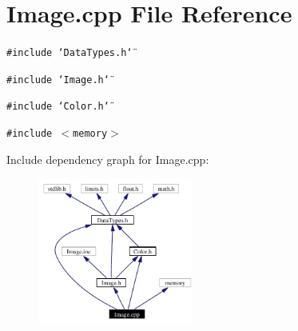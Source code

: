 \section{Image.cpp File Reference}
\label{Image_8cpp}
{\tt \#include \char`\"{}Data\-Types.h\char`\"{}}\par
{\tt \#include \char`\"{}Image.h\char`\"{}}\par
{\tt \#include \char`\"{}Color.h\char`\"{}}\par
{\tt \#include $<$memory$>$}\par


Include dependency graph for Image.cpp:\begin{figure}[H]
\begin{center}
\leavevmode
\includegraphics[width=144pt]{Image_8cpp__incl}
\end{center}
\end{figure}
